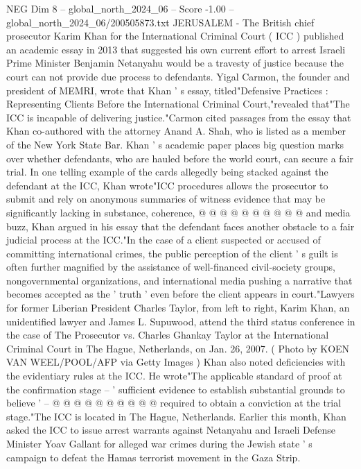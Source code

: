 \begin{textsample}{NEG Dim 8 – global\_north\_2024\_06 – Score -1.00 – global\_north\_2024\_06/200505873.txt}  \label{ex:f8_neg_394}
JERUSALEM - The British chief prosecutor Karim Khan for the International Criminal Court ( ICC ) published an academic essay in 2013 that suggested his own current effort to arrest Israeli Prime Minister Benjamin Netanyahu would be a travesty of justice because the court can not provide due process to defendants.
Yigal Carmon, the founder and president of MEMRI, wrote that Khan ' s essay, titled"Defensive Practices : Representing Clients Before the International Criminal Court,"revealed that"The ICC is incapable of delivering justice."Carmon cited passages from the essay that Khan co-authored with the attorney Anand A.
Shah, who is listed as a member of the New York State Bar.
Khan ' s academic paper places big question marks over whether defendants, who are hauled before the world court, can secure a fair trial.
In one telling example of the cards allegedly being stacked against the defendant at the ICC, Khan wrote"ICC procedures allows the prosecutor to submit and rely on anonymous summaries of witness evidence that may be significantly lacking in substance, coherence, @ @ @ @ @ @ @ @ @ @ and media buzz, Khan argued in his essay that the defendant faces another obstacle to a fair judicial process at the ICC."In the case of a client suspected or accused of committing international crimes, the public perception of the client ' s guilt is often further magnified by the assistance of well-financed civil-society groups, nongovernmental organizations, and international media pushing a narrative that becomes accepted as the ' truth ' even before the client appears in court."Lawyers for former Liberian President Charles Taylor, from left to right, Karim Khan, an unidentified lawyer and James L.
Supuwood, attend the third status conference in the case of The Prosecutor vs.
Charles Ghankay Taylor at the International Criminal Court in The Hague, Netherlands, on Jan. 26, 2007. ( Photo by KOEN VAN WEEL/POOL/AFP via Getty Images ) Khan also noted deficiencies with the evidentiary rules at the ICC.
He wrote"The applicable standard of proof at the confirmation stage -- ' sufficient evidence to establish substantial grounds to believe ' -- @ @ @ @ @ @ @ @ @ @ required to obtain a conviction at the trial stage."The ICC is located in The Hague, Netherlands.
Earlier this month, Khan asked the ICC to issue arrest warrants against Netanyahu and Israeli Defense Minister Yoav Gallant for alleged war crimes during the Jewish state ' s campaign to defeat the Hamas terrorist movement in the Gaza Strip.

\end{textsample}

